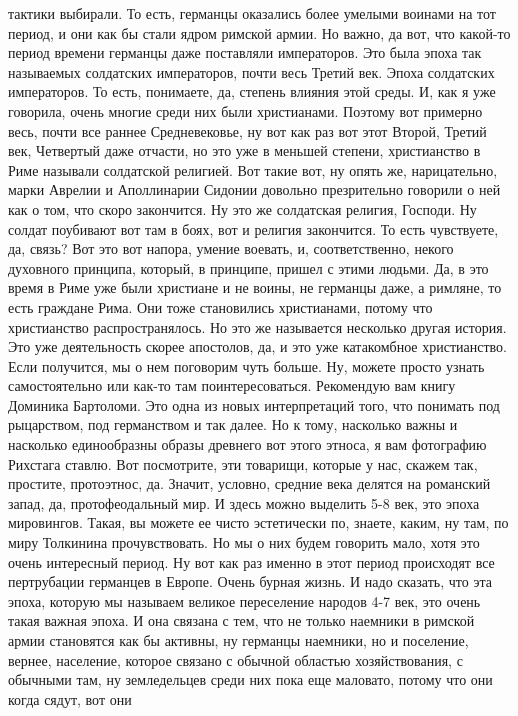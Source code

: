 тактики выбирали. То есть, германцы оказались более умелыми воинами на тот
период, и они как бы стали ядром римской армии. Но важно, да вот, что какой-то
период времени германцы даже поставляли императоров. Это была эпоха так
называемых солдатских императоров, почти весь Третий век. Эпоха солдатских
императоров. То есть, понимаете, да, степень влияния этой среды. И, как я уже
говорила, очень многие среди них были христианами. Поэтому вот примерно весь,
почти все раннее Средневековье, ну вот как раз вот этот Второй, Третий век,
Четвертый даже отчасти, но это уже в меньшей степени, христианство в Риме
называли солдатской религией. Вот такие вот, ну опять же, нарицательно, марки
Аврелии и Аполлинарии Сидонии довольно презрительно говорили о ней как о том,
что скоро закончится. Ну это же солдатская религия, Господи. Ну солдат поубивают
вот там в боях, вот и религия закончится. То есть чувствуете, да, связь? Вот это
вот напора, умение воевать, и, соответственно, некого духовного принципа,
который, в принципе, пришел с этими людьми. Да, в это время в Риме уже были
христиане и не воины, не германцы даже, а римляне, то есть граждане Рима. Они
тоже становились христианами, потому что христианство распространялось. Но это
же называется несколько другая история. Это уже деятельность скорее апостолов,
да, и это уже катакомбное христианство. Если получится, мы о нем поговорим чуть
больше. Ну, можете просто узнать самостоятельно или как-то там поинтересоваться.
Рекомендую вам книгу Доминика Бартоломи. Это одна из новых интерпретаций того,
что понимать под рыцарством, под германством и так далее. Но к тому, насколько
важны и насколько единообразны образы древнего вот этого этноса, я вам
фотографию Рихстага ставлю. Вот посмотрите, эти товарищи, которые у нас, скажем
так, простите, протоэтнос, да. Значит, условно, средние века делятся на
романский запад, да, протофеодальный мир. И здесь можно выделить 5-8 век, это
эпоха мировингов. Такая, вы можете ее чисто эстетически по, знаете, каким, ну
там, по миру Толкинина прочувствовать. Но мы о них будем говорить мало, хотя это
очень интересный период. Ну вот как раз именно в этот период происходят все
пертрубации германцев в Европе. Очень бурная жизнь. И надо сказать, что эта
эпоха, которую мы называем великое переселение народов 4-7 век, это очень такая
важная эпоха. И она связана с тем, что не только наемники в римской армии
становятся как бы активны, ну германцы наемники, но и поселение, вернее,
население, которое связано с обычной областью хозяйствования, с обычными там, ну
земледельцев среди них пока еще маловато, потому что они когда сядут, вот они
